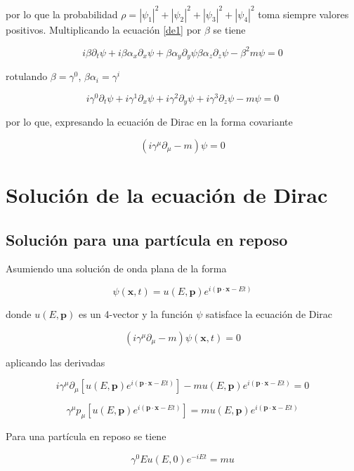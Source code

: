 por lo que la probabilidad $\rho = |\psi_1|^2 + |\psi_2|^2 +|\psi_3|^2+|\psi_4|^2 $ toma siempre valores positivos. Multiplicando la ecuación \ref{de1} por $\beta$ se tiene

$$ i\beta\partial_t \psi +i\beta\alpha_x\partial_x\psi + \beta\alpha_y\partial_y\psi \beta\alpha_z\partial_z\psi -\beta^2m\psi = 0 $$

rotulando $\beta = \gamma^0$, $\beta\alpha_i = \gamma^i$

$$ i\gamma^0\partial_t \psi + i\gamma^1\partial_x \psi + i\gamma^2\partial_y \psi + i\gamma^3\partial_z \psi -m\psi =0 $$

por lo que, expresando la ecuación de Dirac en la forma covariante

$$ (i\gamma^{\mu}\partial_{\mu} - m)\psi = 0 $$

\section{Solución de la ecuación de Dirac}

\subsection{Solución para una partícula en reposo}

Asumiendo una solución de onda plana de la forma

$$ \psi ( \textbf{x}, t) = u(E, \textbf{p})e^{i(\textbf{p}\cdot\textbf{x} - Et)} $$

donde $u(E, \textbf{p})$ es un 4-vector y la función $\psi$ satisface la ecuación de Dirac

$$ (i\gamma^{\mu}\partial_{\mu} -m)\psi(\textbf{x}, t)=0 $$

aplicando las derivadas

$$ i\gamma^{\mu}\partial_{\mu}[u(E, \textbf{p} ) e^{i(\textbf{p} \cdot \textbf{x} - Et)}] - mu(E, \textbf{p})e^{i(\textbf{p}\cdot\textbf{x} - Et)} = 0 $$

$$ \gamma^{\mu}p_{\mu}[u(E, \textbf{p} ) e^{i(\textbf{p} \cdot \textbf{x} - Et)}] = mu(E, \textbf{p})e^{i(\textbf{p}\cdot\textbf{x} - Et)} $$

Para una partícula en reposo se tiene

$$ \gamma^0 Eu(E, 0)e^{-iEt} = mu $$

